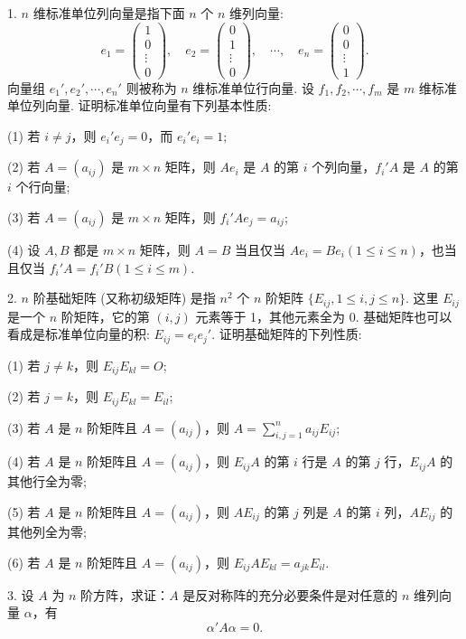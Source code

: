 \documentclass[UTF8,12pt,a4paper,fontset=fandol]{ctexart}
\begin{document}
1. $n$ 维标准单位列向量是指下面 $n$ 个 $n$ 维列向量:
\[
e_1=\left(\begin{array}{c}1\\0\\ \vdots\\0\end{array}\right),\quad
e_2=\left(\begin{array}{c}0\\1\\ \vdots\\0\end{array}\right),\quad \cdots,\quad
e_n=\left(\begin{array}{c}0\\0\\ \vdots\\1\end{array}\right).
\]
向量组 $e_1',e_2',\cdots,e_n'$ 则被称为 $n$ 维标准单位行向量. 设 $f_1,f_2,\cdots,f_m$ 是 $m$ 维标准单位列向量. 证明标准单位向量有下列基本性质:

(1) 若 $i\neq j$，则 $e_i'e_j=0$，而 $e_i'e_i=1$;

(2) 若 $A=(a_{ij})$ 是 $m\times n$ 矩阵，则 $Ae_i$ 是 $A$ 的第 $i$ 个列向量，$f_i'A$ 是 $A$ 的第 $i$ 个行向量;

(3) 若 $A=(a_{ij})$ 是 $m\times n$ 矩阵，则 $f_i'Ae_j=a_{ij}$;

(4) 设 $A,B$ 都是 $m\times n$ 矩阵，则 $A=B$ 当且仅当 $Ae_i=Be_i(1\leq i\leq n)$，也当且仅当 $f_i'A=f_i'B(1\leq i\leq m)$.

2. $n$ 阶基础矩阵 (又称初级矩阵) 是指 $n^2$ 个 $n$ 阶矩阵 $\{E_{ij},1\leq i,j\leq n\}$. 这里 $E_{ij}$ 是一个 $n$ 阶矩阵，它的第 $(i,j)$ 元素等于 1，其他元素全为 0. 基础矩阵也可以看成是标准单位向量的积: $E_{ij}=e_ie_j'$. 证明基础矩阵的下列性质:

(1) 若 $j\neq k$，则 $E_{ij}E_{kl}=O$;

(2) 若 $j=k$，则 $E_{ij}E_{kl}=E_{il}$;

(3) 若 $A$ 是 $n$ 阶矩阵且 $A=(a_{ij})$，则 $A=\sum\limits_{i,j=1}^n a_{ij}E_{ij}$;

(4) 若 $A$ 是 $n$ 阶矩阵且 $A=(a_{ij})$，则 $E_{ij}A$ 的第 $i$ 行是 $A$ 的第 $j$ 行，$E_{ij}A$ 的其他行全为零;

(5) 若 $A$ 是 $n$ 阶矩阵且 $A=(a_{ij})$，则 $AE_{ij}$ 的第 $j$ 列是 $A$ 的第 $i$ 列，$AE_{ij}$ 的其他列全为零;

(6) 若 $A$ 是 $n$ 阶矩阵且 $A=(a_{ij})$，则 $E_{ij}AE_{kl}=a_{jk}E_{il}$.

3. 设 $A$ 为 $n$ 阶方阵，求证：$A$ 是反对称阵的充分必要条件是对任意的 $n$ 维列向量 $\alpha$，有
\[
\alpha'A\alpha=0.
\]
\end{document}
